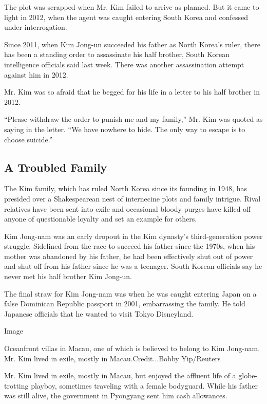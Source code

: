 The plot was scrapped when Mr. Kim failed to arrive as planned. But it
came to light in 2012, when the agent was caught entering South Korea
and confessed under interrogation.

Since 2011, when Kim Jong-un succeeded his father as North Korea's
ruler, there has been a standing order to assassinate his half brother,
South Korean intelligence officials said last week. There was another
assassination attempt against him in 2012.

Mr. Kim was so afraid that he begged for his life in a letter to his
half brother in 2012.

``Please withdraw the order to punish me and my family,'' Mr. Kim was
quoted as saying in the letter. ``We have nowhere to hide. The only way
to escape is to choose suicide.''

\hypertarget{a-troubled-family}{%
\subsection{A Troubled Family}\label{a-troubled-family}}

The Kim family, which has ruled North Korea since its founding in 1948,
has presided over a Shakespearean nest of internecine plots and family
intrigue. Rival relatives have been sent into exile and occasional
bloody purges have killed off anyone of questionable loyalty and set an
example for others.

Kim Jong-nam was an early dropout in the Kim dynasty's third-generation
power struggle. Sidelined from the race to succeed his father since the
1970s, when his mother was abandoned by his father, he had been
effectively shut out of power and shut off from his father since he was
a teenager. South Korean officials say he never met his half brother Kim
Jong-un.

The final straw for Kim Jong-nam was when he was caught entering Japan
on a false Dominican Republic passport in 2001, embarrassing the family.
He told Japanese officials that he wanted to visit Tokyo Disneyland.

Image

Oceanfront villas in Macau, one of which is believed to belong to Kim
Jong-nam. Mr. Kim lived in exile, mostly in Macau.Credit...Bobby
Yip/Reuters

Mr. Kim lived in exile, mostly in Macau, but enjoyed the affluent life
of a globe-trotting playboy, sometimes traveling with a female
bodyguard. While his father was still alive, the government in Pyongyang
sent him cash allowances.

